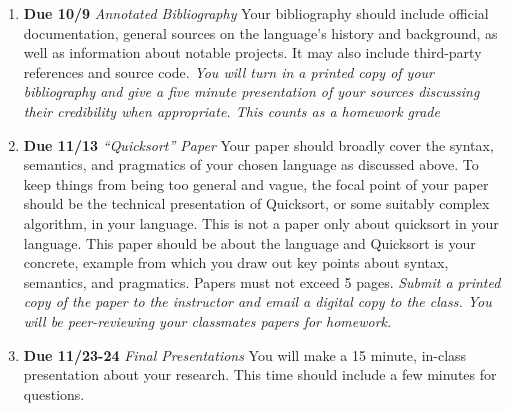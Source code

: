 \documentclass[10pt]{article}
\begin{document}
\begin{enumerate}
\item \textbf{Due 10/9} \textit{Annotated Bibliography }
Your bibliography should include official documentation, general sources on the language's history and background, as well as information about notable projects.  It may also include third-party references and source code.  \textit{You will turn in a printed copy of your bibliography and give a five minute presentation of your sources discussing their credibility when appropriate. This counts as a homework grade}
\item \textbf{Due 11/13} \textit{``Quicksort'' Paper}
Your paper should broadly cover the syntax, semantics, and pragmatics of your chosen language as discussed above. To keep things from being too general and vague, the focal point of your paper should be the technical presentation of Quicksort, or some suitably complex algorithm, in your language. This is not a paper only about quicksort in your language. This paper should be about the language and Quicksort is your concrete, example from which you draw out key points about syntax, semantics, and pragmatics. Papers must not exceed 5 pages. \textit{Submit a printed copy of the paper to the instructor and email a digital copy to the class. You will be peer-reviewing your classmates papers for homework.}
\item \textbf{Due 11/23-24} \textit{Final Presentations}
You will make a 15 minute, in-class presentation about your research.  This time should include a few minutes for questions.  
\end{enumerate}
\end{document}
